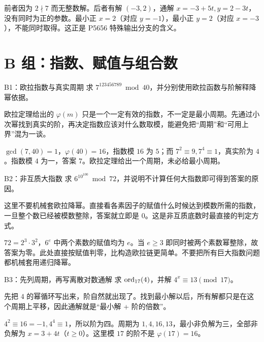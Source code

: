 \sol 前者因为 $2\nmid7$ 而无整数解。后者有解 $(-3,2)$，通解 $x=-3+5t,y=2-3t$，没有同时为正的参数。最小正 $x=2$（对应 $y=-1$），最小正 $y=2$（对应 $x=-3$），不能同时取得。这正是 P5656 特殊输出分支的含义。


\section{B 组：指数、赋值与组合数}
\begin{problem}{B1：欧拉指数与真实周期}
求 $7^{123456789}\bmod40$，并分别使用欧拉函数与阶解释降幂依据。
\end{problem}

\begin{pitfall}[讲解：先看这题到底在做什么]
欧拉定理给出的 $\varphi(m)$ 只是一个一定有效的指数，不一定是最小周期。先通过小次幂找到真实的阶，再决定指数应该对什么数取模，能避免把“周期”和“可用上界”混为一谈。
\end{pitfall}

\sol $\gcd(7,40)=1$，$\varphi(40)=16$，指数模 $16$ 为 $5$；而 $7^2\equiv9,7^4\equiv1$，真实阶为 $4$。指数模 $4$ 为一，答案 $7$。欧拉定理给出一个周期，未必给最小周期。


\begin{problem}{B2：非互质大指数}
求 $6^{10^{100}}\bmod72$，并说明不计算任何大指数即可得到答案的原因。
\end{problem}

\begin{pitfall}[讲解：先看这题到底在做什么]
这里不要机械套欧拉降幂。直接看各素因子的赋值什么时候达到模数所需的指数，一旦整个数已经被模数整除，答案就立即是 $0$。这是非互质底数时最直接的判定方式。
\end{pitfall}

\sol $72=2^3\cdot3^2$，$6^e$ 中两个素数的赋值均为 $e$。当 $e\ge3$ 即同时被两个素数幂整除，故答案为零。此处直接按赋值判零，比构造欧拉链更简单。不要把所有巨大指数问题都机械套用递归降幂。


\begin{problem}{B3：先列周期，再写离散对数通解}
求 $\operatorname{ord}_{17}(4)$，并解 $4^x\equiv13\pmod{17}$。
\end{problem}

\begin{pitfall}[讲解：先看这题到底在做什么]
先把 $4$ 的幂循环写出来，阶自然就出现了。找到最小解以后，所有解都只是在这个周期上平移，因此通解就是“最小解 + 阶的倍数”。
\end{pitfall}

\sol $4^2\equiv16=-1,4^4\equiv1$，所以阶为四。周期为 $1,4,16,13$，最小非负解为三，全部非负解为 $x=3+4t$（$t\ge0$）。这里模 $17$ 的阶不是 $\varphi(17)=16$。



